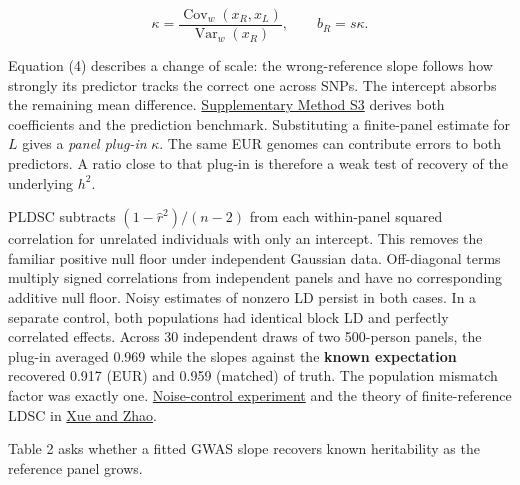 \documentclass[11pt,a4paper]{article}
\begin{document}
\[
\kappa=\frac{\operatorname{Cov}_w(x_R,x_L)}{\operatorname{Var}_w(x_R)},\qquad
b_R=s\kappa. \tag{4}
\]

Equation (4) describes a change of scale: the wrong-reference slope follows how strongly its predictor tracks the correct one across SNPs. The intercept absorbs the remaining mean difference. \hyperref[s3-projection-and-predictive-information]{Supplementary Method S3} derives both coefficients and the prediction benchmark. Substituting a finite-panel estimate for \(L\) gives a \emph{panel plug-in} \(\kappa\). The same EUR genomes can contribute errors to both predictors. A ratio close to that plug-in is therefore a weak test of recovery of the underlying \(h^2\).

PLDSC subtracts \((1-\hat r^2)/(n-2)\) from each within-panel squared correlation for unrelated individuals with only an intercept. This removes the familiar positive null floor under independent Gaussian data. Off-diagonal terms multiply signed correlations from independent panels and have no corresponding additive null floor. Noisy estimates of nonzero LD persist in both cases. In a separate control, both populations had identical block LD and perfectly correlated effects. Across 30 independent draws of two 500-person panels, the plug-in averaged 0.969 while the slopes against the \textbf{known expectation} recovered 0.917 (EUR) and 0.959 (matched) of truth. The population mismatch factor was exactly one. \href{../experiments/reference_score_noise.py}{Noise-control experiment} and the theory of finite-reference LDSC in \href{https://doi.org/10.1214/25-AOS2523}{Xue and Zhao}.

Table 2 asks whether a fitted GWAS slope recovers known heritability as the reference panel grows.
\end{document}
